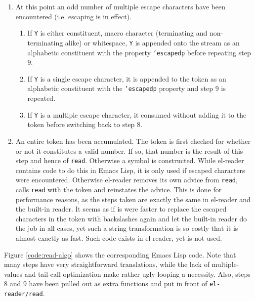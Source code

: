 \documentclass[a4paper,10pt,twoside]{report}
\newcommand{\el}{Emacs Lisp}
\newcommand{\elr}{el-reader}
\newcommand{\fun}[1]{\texttt{#1}}
\newcommand{\Read}{\fun{read}}
\begin{document}
\begin{enumerate}
\item At this point an odd number of multiple escape characters have been
  encountered (i.e. escaping is in effect). 
  \begin{enumerate}
  \item If \texttt{Y} is either constituent, macro character (terminating and
    non-terminating alike) or whitespace, \texttt{Y} is appended onto the stream
    as an alphabetic constituent with the property \texttt{'escapedp} before
    repeating step 9.
  \item If \texttt{Y} is a single escape character, it is appended to the token
    as an alphabetic constituent with the \texttt{'escapedp} property and step 9
    is repeated.
  \item If \texttt{Y} is a multiple escape character, it consumed without adding
    it to the token before switching back to step 8.
  \end{enumerate}
\item An entire token has been accumulated.  The token is first checked for
  whether or not it constitutes a valid number.  If so, that number is the
  result of this step and hence of \Read{}.  Otherwise a symbol is constructed.
  While \elr{} contains code to do this in \el{}, it is only used if escaped
  characters were encountered.  Otherwise \elr{} removes its own advice from
  \Read{}, calls \Read{} with the token and reinstates the advice.  This is done
  for performance reasons, as the steps taken are exactly the same in \elr{} and
  the built-in reader.  It seems as if is were faster to replace the escaped
  characters in the token with backslashes again and let the built-in reader do
  the job in all cases, yet such a string transformation is so costly that it is
  almost exactly as fast.  Such code exists in \elr{}, yet is not used.
\end{enumerate}

Figure \ref{code:read-algo} shows the corresponding \el{} code.  Note that many
steps have very straightforward translations, while the lack of multiple-values
and tail-call optimization make rather ugly looping a necessity.  Also, steps 8
and 9 have been pulled out as extra functions and put in front of
\fun{el-reader/read}. 
\end{document}
